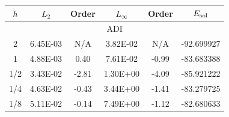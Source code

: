 \begin{table}[!ht]
\centering
\begin{tabular}{c c c c c c }
\hline
$h$ & $L_2$ & Order & $L_\infty$& Order & $E_{\rm sol}$ \\ \hline
\multicolumn{6}{c}{ADI} \\ \hline
  2 & 6.45E-03 & N/A & 3.82E-02 & N/A & -92.699927 \\ %
  1 & 4.88E-03 & 0.40 & 7.61E-02 & -0.99& -83.683388 \\%
1/2 & 3.43E-02 & -2.81 & 1.30E+00 & -4.09 & -85.921222 \\ %
1/4 & 4.63E-02 & -0.43 & 3.44E+00 & -1.41 & -83.279725 \\ %
1/8 & 5.11E-02 & -0.14 & 7.49E+00 & -1.12 & -82.680633 \\ \hline


\end{tabular}
\end{table}
